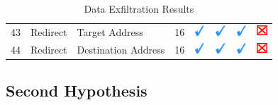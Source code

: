 \documentclass[12pt]{article}
\begin{document}
\begin{savenotes}
\begin{table}[!htpb]
{\begin{tabular}{|C{1.0cm}|L{5.0cm}|L{5.0cm}|C{2.0cm}|C{1.0cm}|C{1.0cm}|C{1.0cm}|C{1.0cm}|}
43&Redirect&Target Address&16&\includegraphics[width=4mm, height=4mm]{ok}&\includegraphics[width=4mm, height=4mm]{ok}&\includegraphics[width=4mm, height=4mm]{ok}&\includegraphics[width=4mm, height=4mm]{notok}\\
44&Redirect&Destination Address&16&\includegraphics[width=4mm, height=4mm]{ok}&\includegraphics[width=4mm, height=4mm]{ok}&\includegraphics[width=4mm, height=4mm]{ok}&\includegraphics[width=4mm, height=4mm]{notok}\\
\hline
\end{tabular}}
\caption{Data Exfiltration Results}
\label{table:exfiltrationResults2}
\end{table}
\end{savenotes}

\clearpage

\subsection{Second Hypothesis}
\label{appendix:resultsSecond}
\end{document}

